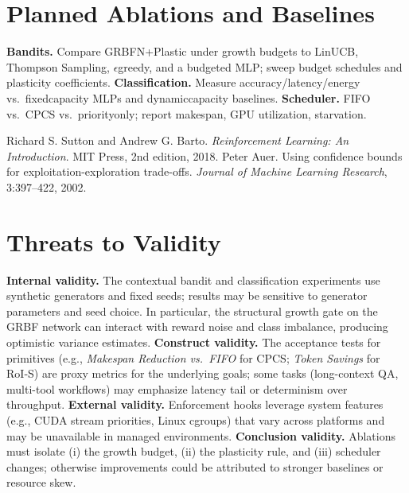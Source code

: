\documentclass[
]{article}
\begin{document}
\section*{Planned Ablations and Baselines}
\textbf{Bandits.} Compare GRBFN+Plastic under growth budgets to LinUCB, Thompson Sampling, $\epsilon$\-greedy, and a budgeted MLP; sweep budget schedules and plasticity coefficients. \textbf{Classification.} Measure accuracy/latency/energy vs.\ fixed\-capacity MLPs and dynamic\-capacity baselines. \textbf{Scheduler.} FIFO vs.\ CPCS vs.\ priority\-only; report makespan, GPU utilization, starvation.


\begin{thebibliography}{9}
 Richard S. Sutton and Andrew G. Barto. \emph{Reinforcement Learning: An Introduction}. MIT Press, 2nd edition, 2018.
 Peter Auer. Using confidence bounds for exploitation-exploration trade-offs. \emph{Journal of Machine Learning Research}, 3:397--422, 2002.
\end{thebibliography}

\section*{Threats to Validity}
\textbf{Internal validity.} The contextual bandit and classification experiments use synthetic generators and fixed seeds; results may be sensitive to generator parameters and seed choice. In particular, the structural growth gate on the GRBF network can interact with reward noise and class imbalance, producing optimistic variance estimates. \textbf{Construct validity.} The acceptance tests for primitives (e.g., \emph{Makespan Reduction vs.\ FIFO} for CPCS; \emph{Token Savings} for RoI‑S) are proxy metrics for the underlying goals; some tasks (long-context QA, multi-tool workflows) may emphasize latency tail or determinism over throughput. \textbf{External validity.} Enforcement hooks leverage system features (e.g., CUDA stream priorities, Linux cgroups) that vary across platforms and may be unavailable in managed environments. \textbf{Conclusion validity.} Ablations must isolate (i) the growth budget, (ii) the plasticity rule, and (iii) scheduler changes; otherwise improvements could be attributed to stronger baselines or resource skew.
\end{document}
